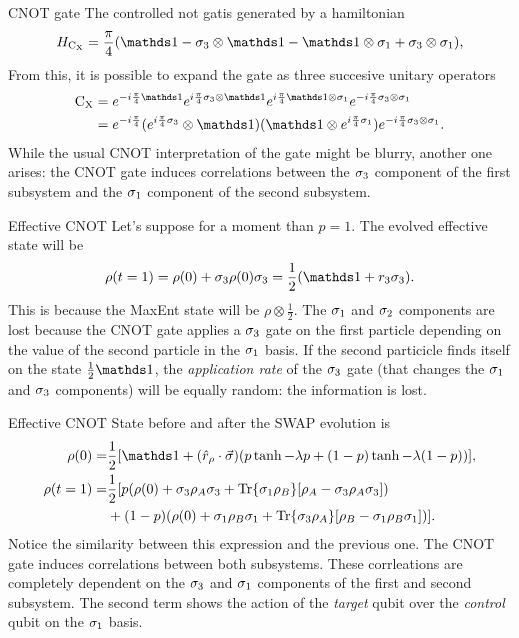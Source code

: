\begin{frame}{CNOT gate}
    The controlled not gatis generated by a hamiltonian
    \begin{equation*}
        H_{\cnot}=\frac{\pi}{4}\qty(\Id-\pauli{3}\otimes\Id-\Id\otimes\pauli{1}+\pauli{3}\otimes\pauli{1}),
    \end{equation*}
    From this, it is possible to expand the gate as three succesive unitary operators
    \begin{align*}
        \cnot&=e^{-i\frac{\pi}{4}\Id}e^{i\frac{\pi}{4}\pauli{3}\otimes\Id}e^{i\frac{\pi}{4}\Id\otimes\pauli{1}}e^{-i\frac{\pi}{4}\pauli{3}\otimes\pauli{1}}\\
        &=e^{-i\frac{\pi}{4}} (e^{i\frac{\pi}{4}\pauli{3}}\otimes \Id) (\Id \otimes e^{i\frac{\pi}{4}\pauli{1}}) e^{-i\frac{\pi}{4}\pauli{3}\otimes\pauli{1}}.
    \end{align*}
    While the usual CNOT interpretation of the gate might be blurry, another one arises: the CNOT gate induces correlations between the $\sigma_{3}$ component of the first subsystem and the $\sigma_{1}$ component of the second subsystem.
\end{frame}

\begin{frame}{Effective CNOT}
    Let's suppose for a moment than $p=1$. The evolved effective state will be
    \begin{equation*}
      \rho(t=1)=\rho(0)+\pauli{3}\rho(0)\pauli{3}=\frac{1}{2}(\Id+r_{3}\pauli{3}).
    \end{equation*}
    This is because the MaxEnt state will be $\rho\otimes\frac{1}{2}$. The $\sigma_{1}$ and $\sigma_{2}$ components are lost because the CNOT gate applies a $\sigma_{3}$ gate on the first particle depending on the value of the second particle in the $\sigma_{1}$ basis. If the second particicle finds itself on the state $\frac{1}{2}\Id$, the \textit{application rate} of the $\sigma_{3}$ gate (that changes the $\sigma_{1}$ and $\sigma_{3}$ components) will be equally random: the information is lost.
\end{frame}

\begin{frame}{Effective CNOT}
    State before and after the SWAP evolution is
    \begin{align*}
        \rho(0)=&\frac{1}{2}[\Id+(\hat{r}_{\rho}\cdot\vec{\sigma})(p\tanh{-\lambda p}+(1-p)\tanh{-\lambda (1-p)})],\\
        \rho(t=1)=&\frac{1}{2}[p(\rho(0)+\sigma_{3}\rho_{A}\sigma_{3}+\Tr{\sigma_{1}\rho_{B}}[\rho_{A}-\sigma_{3}\rho_{A}\sigma_{3}])\\
    &+(1-p)(\rho(0)+\sigma_{1}\rho_{B}\sigma_{1}+\Tr{\sigma_{3}\rho_{A}}[\rho_{B}-\sigma_{1}\rho_{B}\sigma_{1}])].
        \end{align*}
    Notice the similarity between this expression and the previous one. The CNOT gate induces correlations between both subsystems. These corrleations are completely dependent on the $\sigma_{3}$ and $\sigma_{1}$ components of the first and second subsystem.
    The second term shows the action of the \textit{target} qubit over the \textit{control} qubit on the $\sigma_{1}$ basis.
\end{frame}

